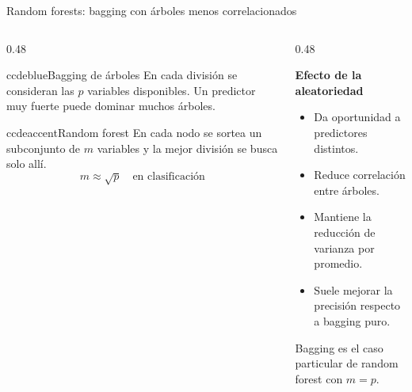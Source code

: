 \documentclass[aspectratio=169,11pt,table]{beamer}
\begin{document}
\begin{frame}{Random forests: bagging con árboles menos correlacionados}
\small
\begin{columns}[T,onlytextwidth]
\begin{column}{0.48\textwidth}
\begin{contrastbox}{ccdeblue}{Bagging de árboles}
\small
En cada división se consideran las \(p\) variables disponibles. Un predictor muy fuerte puede dominar muchos árboles.
\end{contrastbox}
\vspace{0.28cm}
\begin{contrastbox}{ccdeaccent}{Random forest}
\small
En cada nodo se sortea un subconjunto de \(m\) variables y la mejor división se busca solo allí.
\[
m\approx\sqrt{p}\quad\text{en clasificación}
\]
\end{contrastbox}
\end{column}
\begin{column}{0.48\textwidth}
\begin{ccdebox}
\small
\textbf{Efecto de la aleatoriedad}
\begin{itemize}
  \item Da oportunidad a predictores distintos.
  \item Reduce correlación entre árboles.
  \item Mantiene la reducción de varianza por promedio.
  \item Suele mejorar la precisión respecto a bagging puro.
\end{itemize}
\end{ccdebox}
\vspace{0.18cm}
\begin{keybox}
Bagging es el caso particular de random forest con \(m=p\).
\end{keybox}
\end{column}
\end{columns}
\end{frame}
\end{document}
